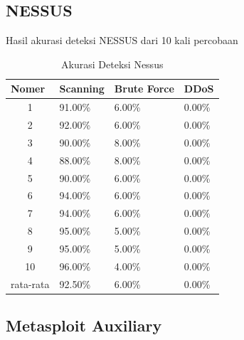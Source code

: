 \subsection{NESSUS}
Hasil akurasi deteksi NESSUS dari 10 kali percobaan
		\begin{table}[H]
			\centering
			\caption{Akurasi Deteksi Nessus}
			\label{Akurasi Deteksi Nessus}
			\begin{tabular}{|c|l|l|l|}
				\hline
				\multicolumn{1}{|l|}{Nomer}     & Scanning & Brute Force & DDoS   \\ \hline
				1                               & 91.00\%  & 6.00\%      & 0.00\% \\ \hline
				2                               & 92.00\%  & 6.00\%      & 0.00\% \\ \hline
				3                               & 90.00\%  & 8.00\%      & 0.00\% \\ \hline
				4                               & 88.00\%  & 8.00\%      & 0.00\% \\ \hline
				5                               & 90.00\%  & 6.00\%      & 0.00\% \\ \hline
				6                               & 94.00\%  & 6.00\%      & 0.00\% \\ \hline
				7                               & 94.00\%  & 6.00\%      & 0.00\% \\ \hline
				8                               & 95.00\%  & 5.00\%      & 0.00\% \\ \hline
				9                               & 95.00\%  & 5.00\%      & 0.00\% \\ \hline
				10                              & 96.00\%  & 4.00\%      & 0.00\% \\ \hline
				\multicolumn{1}{|l|}{rata-rata} & 92.50\%  & 6.00\%      & 0.00\% \\ \hline
			\end{tabular}
		\end{table}
	
\subsection{Metasploit Auxiliary}

